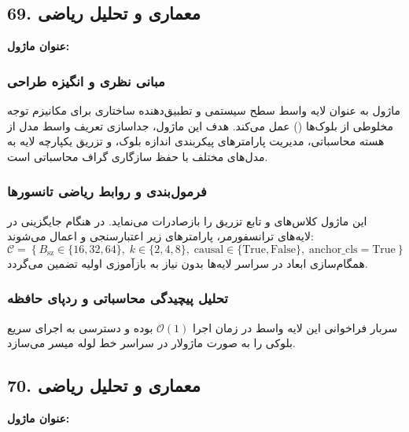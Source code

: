 \subsection*{69. معماری و تحلیل ریاضی }
\textbf{عنوان ماژول:} 

\subsubsection*{مبانی نظری و انگیزه طراحی}
ماژول  به عنوان لایه واسط سطح سیستمی و تطبیق‌دهنده ساختاری برای مکانیزم توجه مخلوطی از بلوک‌ها () عمل می‌کند. هدف این ماژول، جداسازی تعریف واسط مدل از هسته محاسباتی، مدیریت پارامترهای پیکربندی اندازه بلوک، و تزریق یکپارچه لایه به مدل‌های مختلف با حفظ سازگاری گراف محاسباتی است.

\subsubsection*{فرمول‌بندی و روابط ریاضی تانسورها}
این ماژول کلاس‌های  و تابع تزریق  را بازصادرات می‌نماید. در هنگام جایگزینی در لایه‌های ترانسفورمر، پارامترهای زیر اعتبارسنجی و اعمال می‌شوند:
\begin{equation}
\mathcal{C} = \left\{ B_{\text{sz}} \in \{16, 32, 64\}, \; k \in \{2, 4, 8\}, \; \text{causal} \in \{\text{True}, \text{False}\}, \; \text{anchor\_cls} = \text{True} \right\}
\end{equation}
همگام‌سازی ابعاد در سراسر لایه‌ها بدون نیاز به بازآموزی اولیه تضمین می‌گردد.

\subsubsection*{تحلیل پیچیدگی محاسباتی و ردپای حافظه}
سربار فراخوانی این لایه واسط در زمان اجرا $\mathcal{O}(1)$ بوده و دسترسی به اجرای سریع بلوکی را به صورت ماژولار در سراسر خط لوله میسر می‌سازد.


\subsection*{70. معماری و تحلیل ریاضی }
\textbf{عنوان ماژول:} 


